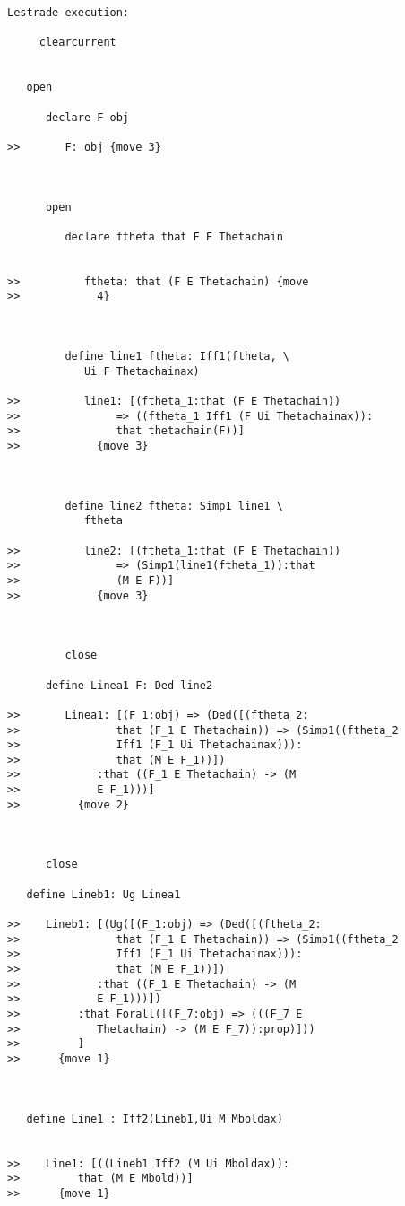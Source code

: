 \documentclass[12pt]{article}
\begin{document}
\begin{verbatim}Lestrade execution:

     clearcurrent


   open

      declare F obj

>>       F: obj {move 3}



      open

         declare ftheta that F E Thetachain


>>          ftheta: that (F E Thetachain) {move
>>            4}



         define line1 ftheta: Iff1(ftheta, \
            Ui F Thetachainax)

>>          line1: [(ftheta_1:that (F E Thetachain))
>>               => ((ftheta_1 Iff1 (F Ui Thetachainax)):
>>               that thetachain(F))]
>>            {move 3}



         define line2 ftheta: Simp1 line1 \
            ftheta

>>          line2: [(ftheta_1:that (F E Thetachain))
>>               => (Simp1(line1(ftheta_1)):that
>>               (M E F))]
>>            {move 3}



         close

      define Linea1 F: Ded line2

>>       Linea1: [(F_1:obj) => (Ded([(ftheta_2:
>>               that (F_1 E Thetachain)) => (Simp1((ftheta_2
>>               Iff1 (F_1 Ui Thetachainax))):
>>               that (M E F_1))])
>>            :that ((F_1 E Thetachain) -> (M
>>            E F_1)))]
>>         {move 2}



      close

   define Lineb1: Ug Linea1

>>    Lineb1: [(Ug([(F_1:obj) => (Ded([(ftheta_2:
>>               that (F_1 E Thetachain)) => (Simp1((ftheta_2
>>               Iff1 (F_1 Ui Thetachainax))):
>>               that (M E F_1))])
>>            :that ((F_1 E Thetachain) -> (M
>>            E F_1)))])
>>         :that Forall([(F_7:obj) => (((F_7 E
>>            Thetachain) -> (M E F_7)):prop)]))
>>         ]
>>      {move 1}



   define Line1 : Iff2(Lineb1,Ui M Mboldax)


>>    Line1: [((Lineb1 Iff2 (M Ui Mboldax)):
>>         that (M E Mbold))]
>>      {move 1}



\end{verbatim}
\end{document}
